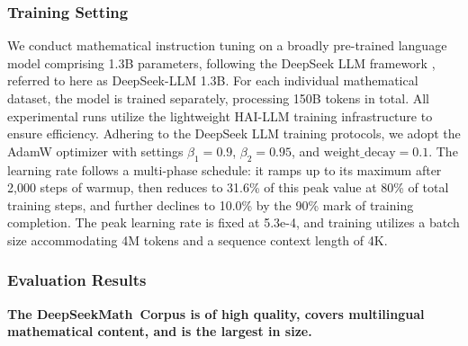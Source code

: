 \begin{itemize}[topsep=0pt]
\subsubsection{Training Setting}
\label{sec:quality-policy}
We conduct mathematical instruction tuning on a broadly pre-trained language model comprising 1.3B parameters, following the DeepSeek LLM framework \citep{deepseek-llm}, referred to here as DeepSeek-LLM 1.3B. For each individual mathematical dataset, the model is trained separately, processing 150B tokens in total. All experimental runs utilize the lightweight HAI-LLM \citep{haillm} training infrastructure to ensure efficiency. Adhering to the DeepSeek LLM training protocols, we adopt the AdamW optimizer \citep{adamW} with settings $\beta_1=0.9$, $\beta_2=0.95$, and $\mathrm{weight\_decay}=0.1$. The learning rate follows a multi-phase schedule: it ramps up to its maximum after 2,000 steps of warmup, then reduces to 31.6\% of this peak value at 80\% of total training steps, and further declines to 10.0\% by the 90\% mark of training completion. The peak learning rate is fixed at 5.3e-4, and training utilizes a batch size accommodating 4M tokens and a sequence context length of 4K.

\subsubsection{Evaluation Results}

\textbf{The DeepSeekMath~Corpus is of high quality, covers multilingual mathematical content, and is the largest in size.}


\end{itemize}
